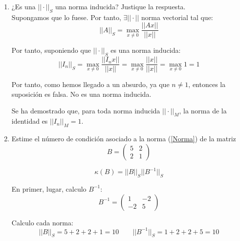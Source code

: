 \documentclass[12pt]{article}
\begin{document}
\begin{ejercicio}
\begin{enumerate}
        \item ¿Es una $||\cdot||_S$ una norma inducida? Justique la respuesta.\\
        
        Supongamos que lo fuese. Por tanto, $\exists ||\cdot||$ norma vectorial tal que:
        \begin{equation*}
            ||A||_S = \max_{x\neq 0} \frac{||Ax||}{||x||}
        \end{equation*}

        Por tanto, suponiendo que $||\cdot||_S$ es una norma inducida:
        \begin{equation*}
            ||I_n||_S = \max_{x\neq 0} \frac{||I_nx||}{||x||} = \max_{x\neq 0} \frac{||x||}{||x||} = \max_{x\neq 0} 1 = 1
        \end{equation*}

        Por tanto, como hemos llegado a un absurdo, ya que $n\neq 1$, entonces la suposición es falsa. No es una norma inducida.

        \begin{observacion}
        Se ha demostrado que, para toda norma inducida $||\cdot||_M$, la norma de la identidad es $||I_n||_M=1$.
        \end{observacion}
        
        \item Estime el número de condición asociado a la norma (\ref{Norma}) de la matriz
        \begin{equation*}
            B=\left(\begin{array}{cc}
                5 & 2 \\
                2 & 1
            \end{array} \right)
        \end{equation*}

        \begin{equation*}
            \kappa(B) = ||B||_S ||B^{-1}||_S
        \end{equation*}

        En primer, lugar, calculo $B^{-1}$:
        \begin{equation*}
            B^{-1}=\left(\begin{array}{cc}
                1 & -2 \\
                -2 & 5
            \end{array} \right)
        \end{equation*}

        Calculo cada norma:
        \begin{equation*}
            ||B||_S = 5+2+2+1 = 10 \qquad ||B^{-1}||_S = 1+2+2+5 = 10
        \end{equation*}


\end{enumerate}
\end{ejercicio}
\end{document}
